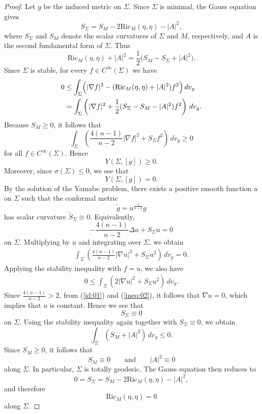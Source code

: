 \documentclass[amssymb,amstex,amsmath,11pt]{article}
\numberwithin{equation}{section}
\theoremstyle{plain}
\theoremstyle{definition}
\theoremstyle{remark}
\def\Ric{\textrm{Ric}}
\begin{document}
\begin{proof}
Let $g$ be the induced metric on $\Sigma$. Since $\Sigma$ is minimal, the Gauss equation gives
$$
S_\Sigma=S_M-2\Ric_M(\eta,\eta)-|A|^2,
$$
where $S_\Sigma$ and $S_M$ denote the scalar curvatures of $\Sigma$ and $M$, respectively, and $A$ is the second fundamental form of $\Sigma$. Thus
$$
\Ric_M(\eta,\eta)+|A|^2=\frac{1}{2}\bigl(S_M-S_\Sigma+|A|^2\bigr).
$$
Since $\Sigma$ is stable, for every $f\in C^\infty(\Sigma)$ we have
\begin{align*}
0
&\le \int_\Sigma \Bigl(|\nabla f|^2-(\Ric_M(\eta,\eta)+|A|^2)f^2\Bigr)\,dv_g \\
&= \int_\Sigma \left(|\nabla f|^2+\frac{1}{2}(S_\Sigma-S_M-|A|^2)f^2\right)\,dv_g.
\end{align*}
Because $S_M\ge 0$, it follows that
$$
\int_\Sigma \left(\frac{4(n-1)}{n-2}|\nabla f|^2+S_\Sigma f^2\right)\,dv_g\ge 0
$$
for all $f\in C^\infty(\Sigma)$. Hence 
$$
Y(\Sigma, [g])\ge 0.
$$
Moreover, since $\sigma(\Sigma)\le 0$, we see that
$$
Y(\Sigma, [g])=0.
$$
By the solution of the Yamabe problem, there exists a positive smooth function $u$ on $\Sigma$ such that the conformal metric
$$
\tilde g=u^{\frac{4}{n-2}}g
$$
has scalar curvature $\tilde S_\Sigma\equiv 0$. Equivalently,
$$
-\frac{4(n-1)}{n-2}\Delta u+S_\Sigma u=0
$$
on $\Sigma$. Multiplying by $u$ and integrating over $\Sigma$, we obtain
\begin{align}
\int_\Sigma \left(\frac{4(n-1)}{n-2}|\nabla u|^2+S_\Sigma u^2\right)\,dv_g=0. \label{id:01}
\end{align}
Applying the stability inequality with $f=u$, we also have
\begin{align}
0\le \int_\Sigma \left(2|\nabla u|^2+S_\Sigma u^2\right)\,dv_g. \label{ineq:02}
\end{align}
Since $\frac{4(n-1)}{n-2}>2$, from (\ref{id:01}) and (\ref{ineq:02}), it follows that $\nabla u=0$, which implies that $u$ is constant. Hence we see that
$$
S_\Sigma\equiv 0
$$
on $\Sigma$. Using the stability inequality again together with $S_\Sigma\equiv 0$, we obtain
$$
\int_\Sigma (S_M+|A|^2)\,dv_g\le 0.
$$
Since $S_M\ge 0$, it follows that
$$
S_M\equiv 0
\qquad\text{and}\qquad
|A|^2\equiv 0
$$
along $\Sigma$. In particular, $\Sigma$ is totally geodesic. The Gauss equation then reduces to
$$
0=S_\Sigma=S_M-2\Ric_M(\eta,\eta)-|A|^2,
$$
and therefore
$$
\Ric_M(\eta,\eta)=0
$$
along $\Sigma$.
\end{proof}
\end{document}
